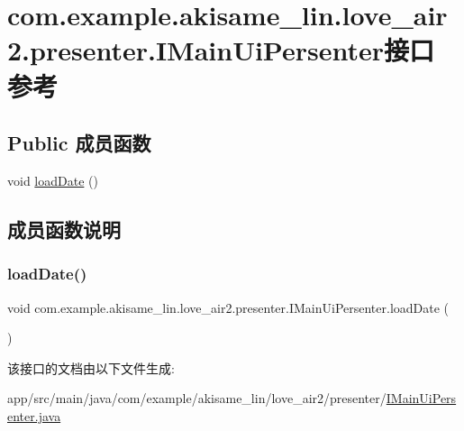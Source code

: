 \hypertarget{interfacecom_1_1example_1_1akisame__lin_1_1love__air2_1_1presenter_1_1_i_main_ui_persenter}{}\section{com.\+example.\+akisame\+\_\+lin.\+love\+\_\+air2.\+presenter.\+I\+Main\+Ui\+Persenter接口 参考}
\label{interfacecom_1_1example_1_1akisame__lin_1_1love__air2_1_1presenter_1_1_i_main_ui_persenter}
\subsection*{Public 成员函数}
\begin{DoxyCompactItemize}
\item 
void \mbox{\hyperlink{interfacecom_1_1example_1_1akisame__lin_1_1love__air2_1_1presenter_1_1_i_main_ui_persenter_af6ac21c7712e79ec2febcb5923514dde}{load\+Date}} ()
\end{DoxyCompactItemize}


\subsection{成员函数说明}
\mbox{\label{interfacecom_1_1example_1_1akisame__lin_1_1love__air2_1_1presenter_1_1_i_main_ui_persenter_af6ac21c7712e79ec2febcb5923514dde}} 
\subsubsection{\texorpdfstring{loadDate()}{loadDate()}}
{\footnotesize\ttfamily void com.\+example.\+akisame\+\_\+lin.\+love\+\_\+air2.\+presenter.\+I\+Main\+Ui\+Persenter.\+load\+Date (\begin{DoxyParamCaption}{ }\end{DoxyParamCaption})}



该接口的文档由以下文件生成\+:\begin{DoxyCompactItemize}
\item 
app/src/main/java/com/example/akisame\+\_\+lin/love\+\_\+air2/presenter/\mbox{\hyperlink{_i_main_ui_persenter_8java}{I\+Main\+Ui\+Persenter.\+java}}\end{DoxyCompactItemize}
